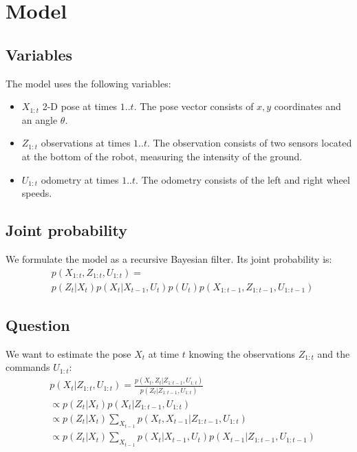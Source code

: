 \documentclass[letterpaper, 10pt, conference]{ieeeconf}
\begin{document}
\section{Model}

\subsection{Variables}

The model uses the following variables:
\begin{itemize}
\item $X_{1:t}$ 2-D pose at times $1..t$.
The pose vector consists of $x,y$ coordinates and an angle $\theta$.
\item $Z_{1:t}$ observations at times $1..t$.
The observation consists of two sensors located at the bottom of the robot, measuring the intensity of the ground.
\item $U_{1:t}$ odometry at times $1..t$.
The odometry consists of the left and right wheel speeds.
\end{itemize}

\subsection{Joint probability}

We formulate the model as a recursive Bayesian filter.
Its joint probability is:
\begin{equation}
\begin{split}
& p(X_{1:t}, Z_{1:t}, U_{1:t}) = \\
& p(Z_t|X_t) p(X_t|X_{t-1}, U_{t}) p(U_t) p(X_{1:t-1}, Z_{1:t-1}, U_{1:t-1})
\end{split}
\end{equation}

\subsection{Question}

We want to estimate the pose $X_t$ at time $t$ knowing the observations $Z_{1:t}$ and the commands $U_{1:t}$:
\begin{equation}
\begin{split}
& p(X_t|Z_{1:t},U_{1:t}) = \frac{p(X_t,Z_t | Z_{1:t-1}, U_{1:t})}{p(Z_t|Z_{1:t-1}, U_{1:t})} \\
 &\propto p(Z_t | X_t) p(X_t | Z_{1:t-1}, U_{1:t}) \\
 &\propto p(Z_t | X_t) \sum_{X_{t-1}} p(X_t, X_{t-1} | Z_{1:t-1}, U_{1:t} ) \\
 &\propto p(Z_t | X_t) \sum_{X_{t-1}} p(X_t|X_{t-1}, U_t) p(X_{t-1} | Z_{1:t-1}, U_{1:t-1})
\end{split}
\end{equation}
\end{document}
